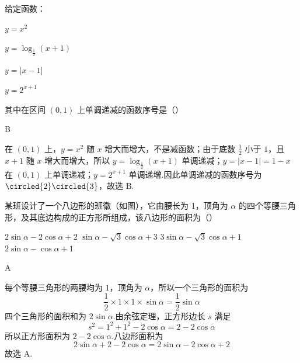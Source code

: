 \begin{problem}
给定函数：

\begin{circlelist}
\item \( y = x^{2} \)
\item \( y = \log_{\frac{1}{2}}(x + 1) \)
\item \( y = |x - 1| \)
\item \( y = 2^{x + 1} \)
\end{circlelist}

其中在区间 \( (0, 1) \) 上单调递减的函数序号是（\quad）

\choices
    {}
    {}
    {}
    {}
\end{problem}

\begin{answer}
B
\end{answer}

\begin{solution}
在 \((0,1)\) 上，\(y=x^2\) 随 \(x\) 增大而增大，不是减函数；由于底数 \(\frac{1}{2}\) 小于 \(1\)，且 \(x+1\) 随 \(x\) 增大而增大，所以 \(y=\log_{\frac{1}{2}}(x+1)\) 单调递减；\(y=|x-1|=1-x\) 在 \((0,1)\) 上单调递减；\(y=2^{x+1}\) 单调递增.因此单调递减的函数序号为 \(\circled{2}\circled{3}\)，故选 B.
\end{solution}

\begin{problem}
某班设计了一个八边形的班徽（如图），它由腰长为 1，顶角为 \(\alpha\) 的四个等腰三角形，及其底边构成的正方形所组成，该八边形的面积为（\quad）


\choices
    {\(2\sin \alpha - 2\cos \alpha + 2\)}
    {\(\sin \alpha -\sqrt{3}\cos \alpha +3\)}
    {\(3\sin \alpha -\sqrt{3}\cos \alpha +1\)}
    {\(2\sin \alpha -\cos \alpha +1\)}
\end{problem}

\begin{answer}
A
\end{answer}

\begin{solution}
每个等腰三角形的两腰均为 \(1\)，顶角为 \(\alpha\)，所以一个三角形的面积为
\[
\frac{1}{2}\times1\times1\times\sin\alpha=\frac{1}{2}\sin\alpha
\]
四个三角形的面积和为 \(2\sin\alpha\).由余弦定理，正方形边长 \(s\) 满足
\[
s^2=1^2+1^2-2\cos\alpha=2-2\cos\alpha
\]
所以正方形面积为 \(2-2\cos\alpha\).八边形面积为
\[
2\sin\alpha+2-2\cos\alpha=2\sin\alpha-2\cos\alpha+2
\]
故选 A.
\end{solution}

